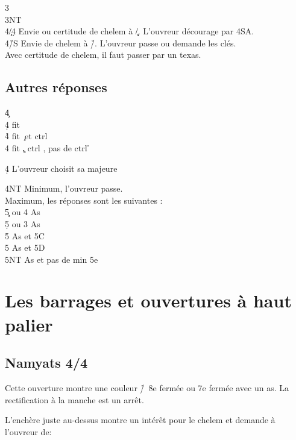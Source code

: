 \documentclass[a4paper]{article}
\begin{document}
\begin{bidtable}
3\s\+\\
3NT\+\\
4\c/4\d \> Envie ou certitude de chelem à \c /\d . L'ouvreur décourage par 4SA.\\
4\h/S \> Envie de chelem à \h /\s . L'ouvreur passe ou demande les clés.\\
\>Avec certitude de chelem, il faut passer par un texas.\-\-
\end{bidtable}

\subsection{Autres réponses}

\begin{bidtable}
4\c\+\\
4\d \> fit \d \\
4\h \> fit \c\ et ctrl \h \\
4\s \> fit \c , ctrl \s , pas de ctrl \h \-
\end{bidtable}

\begin{bidtable}
4\d \> L'ouvreur choisit sa majeure
\end{bidtable}

\begin{bidtable}
4NT \> Minimum, l'ouvreur passe.\\
\>Maximum, les réponses sont les suivantes :\+\\
5\c {} ou 4 As\\
5\d {} ou 3 As\\
5\h {} As et 5C\\
5\s {} As et 5D\\
5NT  As et pas de min 5e\-
\end{bidtable}

\section{Les barrages et ouvertures à haut palier}

\subsection{Namyats 4\pdfc/4\pdfd}

Cette ouverture montre une couleur \h /\s\ 8e fermée ou 7e fermée avec un as.
La rectification à la manche est un arrêt.

L'enchère juste au-dessus montre un intérêt pour le chelem et demande à l'ouvreur de:
\end{document}
